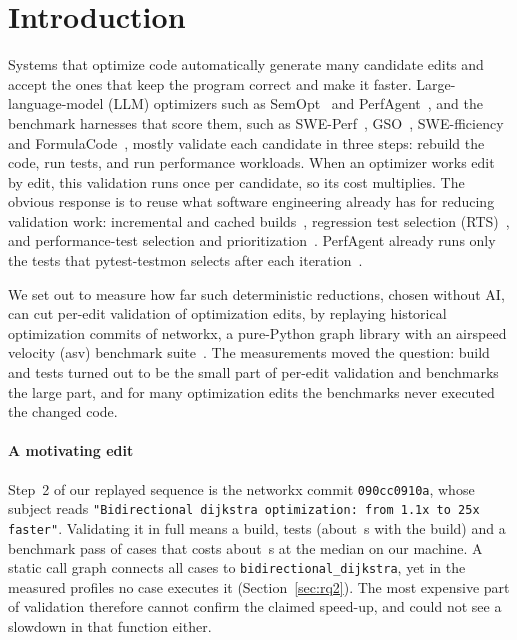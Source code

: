 \section{Introduction}
\label{sec:intro}

Systems that optimize code automatically generate many candidate edits and accept the ones that keep the program correct and make it faster.
Large-language-model (LLM) optimizers such as SemOpt~\cite{zhao2026semopt} and PerfAgent~\cite{deng2026perfagent}, and the benchmark harnesses that score them, such as SWE-Perf~\cite{he2025sweperf}, GSO~\cite{gso2025}, SWE-fficiency~\cite{ma2025swefficiency} and FormulaCode~\cite{sehgal2026formulacode}, mostly validate each candidate in three steps: rebuild the code, run tests, and run performance workloads.
When an optimizer works edit by edit, this validation runs once per candidate, so its cost multiplies.
The obvious response is to reuse what software engineering already has for reducing validation work: incremental and cached builds~\cite{mokhov2020buildsystems,gallaba2020kotinos}, regression test selection (RTS)~\cite{rothermel1997safe,gligoric2015ekstazi,LegunsenShiMarinov2017,WangPradelLiu2026}, and performance-test selection and prioritization~\cite{deoliveira2017perphecy,mostafa2017perfranker,laaber2021tcp}.
PerfAgent already runs only the tests that pytest-testmon selects after each iteration~\cite{deng2026perfagent}.

We set out to measure how far such deterministic reductions, chosen without AI, can cut per-edit validation of optimization edits, by replaying historical optimization commits of networkx, a pure-Python graph library with an airspeed velocity (asv) benchmark suite~\cite{asvdocs}.
The measurements moved the question: build and tests turned out to be the small part of per-edit validation and benchmarks the large part, and for many optimization edits the benchmarks never executed the changed code.

\paragraph*{A motivating edit}
Step~2 of our replayed sequence is the networkx commit \texttt{090cc0910a}, whose subject reads \texttt{"Bidirectional dijkstra optimization: from 1.1x to 25x faster"}.
Validating it in full means a build, \NxNumTests{} tests (about \NxBuildTests\,s with the build) and a benchmark pass of \NxBenchCases{} cases that costs about \NxBenchPassMedian\,s at the median on our machine.
A static call graph connects all \NxBenchCases{} cases to \texttt{bidirectional\_dijkstra}, yet in the measured profiles no case executes it (Section~\ref{sec:rq2}).
The most expensive part of validation therefore cannot confirm the claimed speed-up, and could not see a slowdown in that function either.

